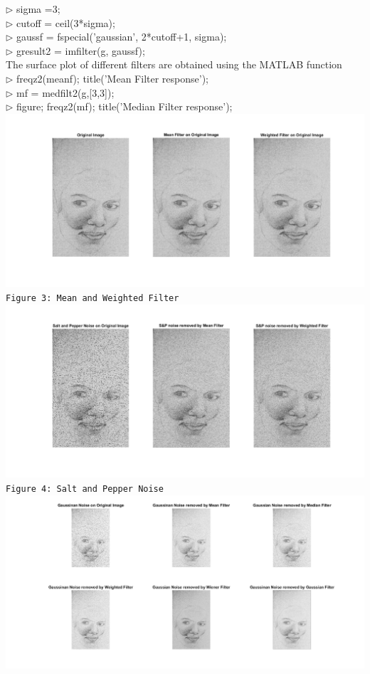 \documentclass[12pt]{article}
\begin{document}
$\rhd$ \quad sigma =3;\\
$\rhd$ \quad cutoff = ceil(3*sigma); \\
$\rhd$  \quad gaussf = fspecial('gaussian', 2*cutoff+1, sigma);\\
$\rhd$  \quad gresult2 = imfilter(g, gaussf); \\
The surface plot of different filters are obtained using the MATLAB function\\
$\rhd$ \quad freqz2(meanf); title('Mean Filter response'); \\
$\rhd$ \quad mf = medfilt2(g,[3,3]);\\
$\rhd$ \quad figure; freqz2(mf); title('Median Filter response'); 
\newpage
\includegraphics[scale = 0.5]{output_labsix_1.png}\\
\texttt{Figure 3:  Mean and Weighted Filter}\\
\includegraphics[scale = 0.5]{output_labsix_2.png}\\
\texttt{Figure 4:  Salt and Pepper Noise}\\
\includegraphics[scale = 0.5]{output_labsix_3.png}\\
\end{document}
